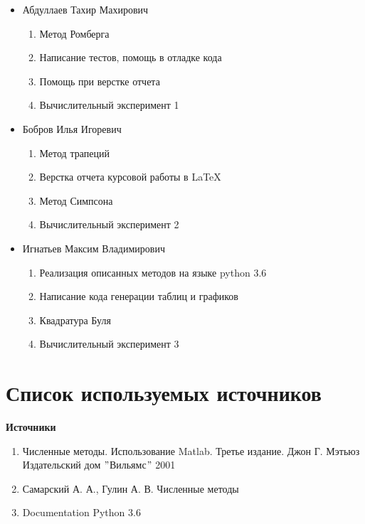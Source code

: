 \documentclass[14pt, titlepage, a4paper]{extarticle} %
\begin{document}
	\begin{itemize}
		\item Абдуллаев Тахир Махирович
		\begin{enumerate}
			\item Метод Ромберга
			\item Написание тестов, помощь в отладке кода
			\item Помощь при верстке отчета
			\item Вычислительный эксперимент 1
		\end{enumerate}
		\item Бобров Илья Игоревич
		\begin{enumerate}
			\item Метод трапеций
			\item Верстка отчета курсовой работы в LaTeX
			\item Метод Симпсона
			\item Вычислительный эксперимент 2
		\end{enumerate}
		\item Игнатьев Максим Владимирович
		\begin{enumerate}
			\item Реализация описанных методов на языке python 3.6
			\item Написание кода генерации таблиц и графиков
			\item Квадратура Буля
			\item Вычислительный эксперимент 3
		\end{enumerate}
	\end{itemize}

	\pagebreak
	
	\section*{Список используемых источников}
	
	\textbf{Источники}
	\begin{enumerate}
		\item Численные методы. Использование Matlab. Третье издание. Джон Г. Мэтьюз Издательский дом $"$Вильямс$"$ 2001
		\item Самарский А. А., Гулин А. В. Численные методы
		
		\item Documentation Python 3.6	
	\end{enumerate}

	\pagebreak
	
\end{document}
